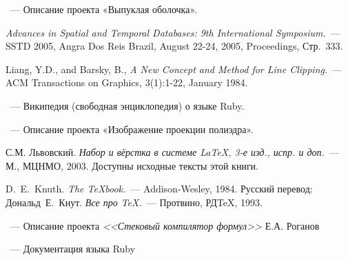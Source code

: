 \begin{thebibliography}{}

~---
Описание проекта «Выпуклая оболочка».

{\em Advances in Spatial and Temporal Databases: 9th International Symposium.}~---
SSTD 2005, Angra Dos Reis Brazil, August 22-24, 2005, Proceedings, Стр.~333.

Liang, Y.D., and Barsky, B., {\em A New Concept and Method for Line Clipping.}~---
ACM Transactions on Graphics, 3(1):1-22, January 1984.

~---
Википедия (свободная энциклопедия) о языке Ruby.

~---
Описание проекта «Изображение проекции полиэдра».

С.М. Львовский.
{\em Набор и вёрстка в системе \LaTeX, 3-е изд., испр. и доп.}~---
М., МЦНМО, 2003. Доступны исходные тексты этой книги.

D.~E.~Knuth. {\em The \TeX book.}~---
Addison-Wesley, 1984. Русский перевод:
Дональд~Е.~Кнут.
{\em Все про \TeX.}~--- Протвино, РД\TeX, 1993.

~---
Описание проекта \emph{<<Стековый компилятор формул>>}
Е.А. Роганов


~---
Документация языка Ruby


\end{thebibliography}
